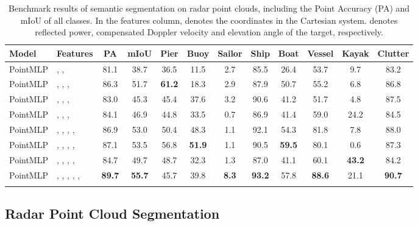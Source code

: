 \documentclass[lettersize,journal]{IEEEtran}
\begin{document}
\begin{table*}[!h]
\caption{Benchmark results of semantic segmentation on radar point clouds, including the Point Accuracy (PA) and mIoU of all classes. In the features column,  denotes the coordinates in the Cartesian system.  denotes reflected power, compensated Doppler velocity and elevation angle of the target, respectively.}
\center
\footnotesize
\begin{tabular}{ll|cc|cccccccc}
\toprule


\bf{Model} & \bf{Features} & \bf{PA} & \bf{mIoU} & \bf{Pier} & \bf{Buoy} & \bf{Sailor} & \bf{Ship} & \bf{Boat} & \bf{Vessel} & \bf{Kayak} & \bf{Clutter}  \\\midrule

PointMLP \cite{ma2022rethinking} & , ,  & 81.1 & 38.7 & 36.5 & 11.5 & 2.7 & 85.5 & 26.4 & 53.7 & 9.7 & 83.2\\
PointMLP \cite{ma2022rethinking} & , , ,  & 86.3 & 51.7 & \textbf{61.2} & 18.3 & 2.9 & 87.9 & 50.7 & 55.2 & 6.8 & 86.8 \\
PointMLP \cite{ma2022rethinking} & , , ,  & 83.0 &  45.3 & 45.4 & 37.6 & 3.2 & 90.6 & 41.2 & 51.7 & 4.8 & 87.5 \\
PointMLP \cite{ma2022rethinking} & , , ,  & 84.1 &  46.9 & 44.8 & 33.5 & 0.7 & 86.9 & 41.4 & 59.0 & 24.2 & 84.5 \\
PointMLP \cite{ma2022rethinking} & , , , ,  & 86.9 & 53.0 & 50.4 & 48.3 & 1.1 & 92.1 & 54.3 & 81.8 & 7.8 & 88.0 \\
PointMLP \cite{ma2022rethinking} & , , , ,  & 87.1 & 53.5 & 56.8 & \textbf{51.9} & 1.1 & 90.5 & \textbf{59.5} & 80.1 & 0.6 & 87.3 \\
PointMLP \cite{ma2022rethinking} & , , , ,  & 84.7 & 49.7 & 48.7 & 32.3 & 1.3 & 87.0 & 41.1 & 60.1 & \textbf{43.2} & 84.2 \\
PointMLP \cite{ma2022rethinking} & , , , , ,  & \textbf{89.7} & \textbf{55.7} & 45.7 & 39.8 & \textbf{8.3} & \textbf{93.2} & 57.8 & \textbf{88.6} & 21.1 & \textbf{90.7} \\
\bottomrule
\vspace{-2mm}
\end{tabular}

\label{tab:semantic_segmentation_PC}
\vspace{-2mm}
\end{table*}

\subsection{Radar Point Cloud Segmentation}
\end{document}
